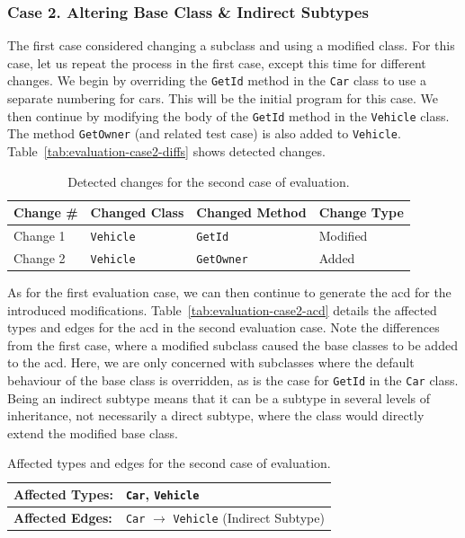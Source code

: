 \documentclass[a4paper,english,12pt]{report}
\newcommand{\textcf}{\texttt}
\begin{document}
\subsubsection{Case 2. Altering Base Class \& Indirect Subtypes}
The first case considered changing a subclass and using a modified class. For this case, let us repeat the process in the first case, except this time for different changes. We begin by overriding the \textcf{GetId} method in the \textcf{Car} class to use a separate numbering for cars. This will be the initial program for this case. We then continue by modifying the body of the \textcf{GetId} method in the \textcf{Vehicle} class. The method \textcf{GetOwner} (and related test case) is also added to \textcf{Vehicle}. Table~\vref{tab:evaluation-case2-diffs} shows detected changes.

\begin{table}[bp]
  \centering
  \begin{tabular}{|l|l|l|l|}
    \hline
    \textbf{Change \#} & \textbf{Changed Class} & \textbf{Changed Method} & \textbf{Change Type}\\
    \hline
    Change 1 & \textcf{Vehicle} & \textcf{GetId} & Modified\\
    \hline
    Change 2 & \textcf{Vehicle} & \textcf{GetOwner} & Added\\
    \hline
  \end{tabular}
  \caption{Detected changes for the second case of evaluation.}
  \label{tab:evaluation-case2-diffs}
\end{table}

As for the first evaluation case, we can then continue to generate the \gls{acd} for the introduced modifications. Table~\vref{tab:evaluation-case2-acd} details the affected types and edges for the \gls{acd} in the second evaluation case. Note the differences from the first case, where a modified subclass caused the base classes to be added to the \gls{acd}. Here, we are only concerned with subclasses where the default behaviour of the base class is overridden, as is the case for \textcf{GetId} in the \textcf{Car} class. Being an indirect subtype means that it can be a subtype in several levels of inheritance, not necessarily a direct subtype, where the class would directly extend the modified base class.

\begin{table}[htbp]
  \centering
  \begin{tabular}{|l|l|}
    \hline
    \textbf{Affected Types:} & \textcf{Car}, \textcf{Vehicle}\\
    \hline
    \textbf{Affected Edges:} & \textcf{Car} $\to$ \textcf{Vehicle} (Indirect Subtype)\\
    \hline
  \end{tabular}
  \caption{Affected types and edges for the second case of evaluation.}
  \label{tab:evaluation-case2-acd}
\end{table}
\end{document}
